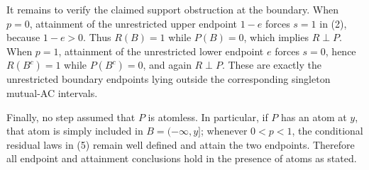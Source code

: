 It remains to verify the claimed support obstruction at the boundary.  When \(p=0\), attainment of the unrestricted upper endpoint \(1-e\) forces \(s=1\) in (2), because \(1-e>0\).  Thus \(R(B)=1\) while \(P(B)=0\), which implies \(R\perp P\).  When \(p=1\), attainment of the unrestricted lower endpoint \(e\) forces \(s=0\), hence \(R(B^c)=1\) while \(P(B^c)=0\), and again \(R\perp P\).  These are exactly the unrestricted boundary endpoints lying outside the corresponding singleton mutual-AC intervals.

Finally, no step assumed that \(P\) is atomless.  In particular, if \(P\) has an atom at \(y\), that atom is simply included in \(B=(-\infty,y]\); whenever \(0<p<1\), the conditional residual laws in (5) remain well defined and attain the two endpoints.  Therefore all endpoint and attainment conclusions hold in the presence of atoms as stated.